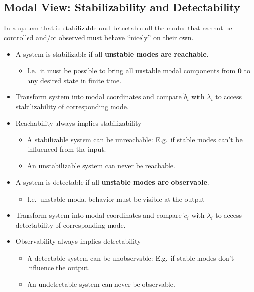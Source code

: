 \subsection{Modal View: Stabilizability and Detectability}
In a system that is stabilizable and detectable all the modes that cannot be controlled and/or observed must behave ``nicely'' on their own.

\newpar{}
\begin{itemize}
    \item A system is stabilizable if all \textbf{unstable modes are reachable}.
          \begin{itemize}
              \item I.e.\ it must be possible to bring all unstable modal components from $\mathbf{0}$ to any desired state in finite time.
          \end{itemize}
    \item Transform system into modal coordinates and compare $\tilde{b}_i$ with $\lambda_i$ to access stabilizability of corresponding mode.
    \item Reachability always implies stabilizability
          \begin{itemize}
              \item A stabilizable system can be unreachable: E.g.\ if stable modes can't be influenced from the input.
              \item An unstabilizable system can never be reachable.
          \end{itemize}
\end{itemize}

\newpar{}
\begin{itemize}
    \item A system is detectable if all \textbf{unstable modes are observable}.
          \begin{itemize}
              \item I.e.\ unstable modal behavior must be visible at the output
          \end{itemize}
          \item Transform system into modal coordinates and compare $\tilde{c}_i$ with $\lambda_i$ to access detectability of corresponding mode.
    \item Observability always implies detectability
          \begin{itemize}
              \item A detectable system can be unobservable: E.g.\ if stable modes don't influence the output.
              \item An undetectable system can never be observable.
          \end{itemize}
\end{itemize}

